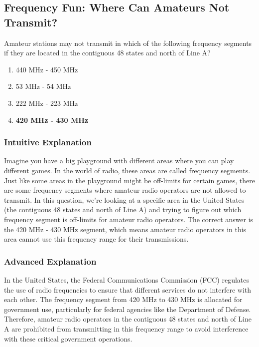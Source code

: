 \subsection{Frequency Fun: Where Can Amateurs Not Transmit?}

\begin{tcolorbox}[colback=gray!10!white,colframe=black!75!black,title=\textbf{E1F05}]
Amateur stations may not transmit in which of the following frequency segments if they are located in the contiguous 48 states and north of Line A?
\begin{enumerate}[label=\Alph*.]
    \item 440 MHz - 450 MHz
    \item 53 MHz - 54 MHz
    \item 222 MHz - 223 MHz
    \item \textbf{420 MHz - 430 MHz}
\end{enumerate}
\end{tcolorbox}

\subsubsection*{Intuitive Explanation}
Imagine you have a big playground with different areas where you can play different games. In the world of radio, these areas are called frequency segments. Just like some areas in the playground might be off-limits for certain games, there are some frequency segments where amateur radio operators are not allowed to transmit. In this question, we’re looking at a specific area in the United States (the contiguous 48 states and north of Line A) and trying to figure out which frequency segment is off-limits for amateur radio operators. The correct answer is the 420 MHz - 430 MHz segment, which means amateur radio operators in this area cannot use this frequency range for their transmissions.

\subsubsection*{Advanced Explanation}
In the United States, the Federal Communications Commission (FCC) regulates the use of radio frequencies to ensure that different services do not interfere with each other. The frequency segment from 420 MHz to 430 MHz is allocated for government use, particularly for federal agencies like the Department of Defense. Therefore, amateur radio operators in the contiguous 48 states and north of Line A are prohibited from transmitting in this frequency range to avoid interference with these critical government operations.

